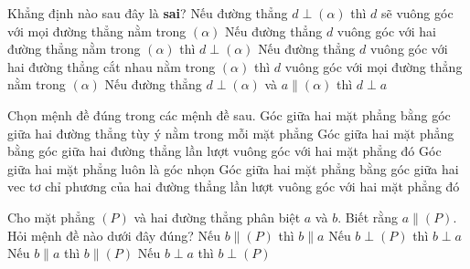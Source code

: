 

\begin{ex}%
	Khẳng định nào  sau đây là \textbf{sai}?
	 \choice
		{Nếu đường thẳng $d\perp (\alpha)$ thì $d$ sẽ vuông góc với  mọi đường thẳng nằm trong $(\alpha)$}
		{\True Nếu đường thẳng $d$ vuông góc với hai  đường thẳng nằm trong $(\alpha)$ thì $d\perp (\alpha)$}
		{Nếu đường thẳng $d$ vuông góc với hai đường thẳng cắt  nhau nằm trong $(\alpha)$ thì $d$ vuông góc với mọi đường thẳng nằm trong $(\alpha)$}
		{Nếu đường thẳng $d\perp (\alpha)$ và $a\parallel (\alpha)$ thì $d\perp  a$}
\end{ex}

\begin{ex}%
	Chọn mệnh đề đúng  trong các mệnh đề sau.
	 \choice
		{Góc giữa  hai mặt phẳng bằng góc giữa hai đường thẳng tùy ý nằm trong mỗi mặt phẳng}
		{\True Góc giữa hai mặt phẳng bằng góc giữa hai đường thẳng  lần lượt vuông góc với hai mặt phẳng đó}
		{Góc  giữa hai mặt phẳng luôn là góc nhọn}
		{Góc giữa hai mặt phẳng bằng góc giữa hai vec tơ chỉ phương của hai đường thẳng lần lượt vuông góc với hai  mặt phẳng đó}
\end{ex}

\begin{ex}%
	Cho mặt phẳng $(P)$  và hai đường thẳng phân biệt $a$ và $b$. Biết rằng $a\parallel (P)$. Hỏi mệnh đề nào dưới đây đúng?
	\choice 
		{Nếu $b\parallel (P)$ thì $b\parallel a$} 
		{\True  Nếu $b\perp (P)$ thì $b\perp a$}
		 {Nếu $b\parallel a$ thì $b\parallel (P)$}
		{Nếu $b\perp a$ thì  $b\perp (P)$}
\end{ex}

